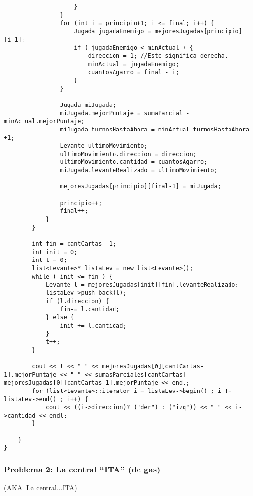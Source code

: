 \documentclass[11pt, a4paper, twoside]{article}
\begin{document}
\begin{lstlisting}
					}
				}
				for (int i = principio+1; i <= final; i++) {
					Jugada jugadaEnemigo = mejoresJugadas[principio][i-1];
					if ( jugadaEnemigo < minActual ) {
						direccion = 1; //Esto significa derecha.
						minActual = jugadaEnemigo;
						cuantosAgarro = final - i;
					}
				}

				Jugada miJugada;
				miJugada.mejorPuntaje = sumaParcial - minActual.mejorPuntaje;
				miJugada.turnosHastaAhora = minActual.turnosHastaAhora +1;
				Levante ultimoMovimiento;
				ultimoMovimiento.direccion = direccion;
				ultimoMovimiento.cantidad = cuantosAgarro;
				miJugada.levanteRealizado = ultimoMovimiento;
				
				mejoresJugadas[principio][final-1] = miJugada;

				principio++;
				final++;
			}
		}

		int fin = cantCartas -1;
		int init = 0;
		int t = 0;
		list<Levante>* listaLev = new list<Levante>();
		while ( init <= fin ) {
			Levante l = mejoresJugadas[init][fin].levanteRealizado;
			listaLev->push_back(l);
			if (l.direccion) {
				fin-= l.cantidad;
			} else {
				init += l.cantidad;
			}
			t++;
		}

		cout << t << " " << mejoresJugadas[0][cantCartas-1].mejorPuntaje << " " << sumasParciales[cantCartas] - mejoresJugadas[0][cantCartas-1].mejorPuntaje << endl;
		for (list<Levante>::iterator i = listaLev->begin() ; i != listaLev->end() ; i++) {
			cout << ((i->direccion)? ("der") : ("izq")) << " " << i->cantidad << endl;
		}

	}
}

\end{lstlisting}
\clearpage  
  
\subsubsection{Problema 2: La central ``ITA'' (de gas)}
  {\scriptsize(AKA: La central...ITA)}
   
\end{document}
